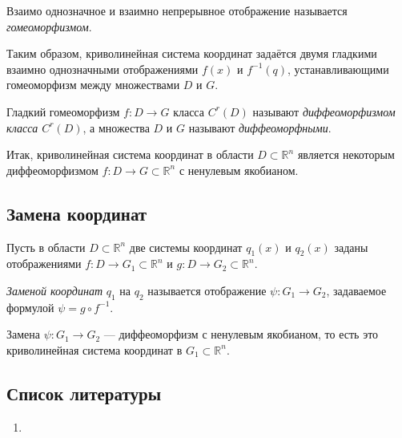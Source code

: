 \begin{definition}
  Взаимо однозначное и взаимно непрерывное отображение называется
  \textit{гомеоморфизмом}.
\end{definition}

Таким образом, криволинейная система координат задаётся двумя гладкими взаимно
однозначными отображениями $f(x)$ и $f^{-1}(q)$, устанавливающими гомеоморфизм
между множествами $D$ и $G$.

\begin{definition}
  Гладкий гомеоморфизм $f : D \to G$ класса $C^r(D)$ называют
  \textit{диффеоморфизмом класса $C^r(D)$}, а множества $D$ и $G$ называют
  \textit{диффеоморфными}.
\end{definition}

Итак, криволинейная система координат в области $D \subset \mathbb{R}^n$
является некоторым диффеоморфизмом $f : D \to G \subset \mathbb{R}^n$ с
ненулевым якобианом.

\subsection{Замена координат}

Пусть в области $D \subset \mathbb{R}^n$ две системы координат $q_1(x)$ и
$q_2(x)$ заданы отображениями $f : D \to G_1 \subset \mathbb{R}^n$ и
$g : D \to G_2 \subset \mathbb{R}^n$.

\begin{definition}
  \textit{Заменой координат} $q_1$ на $q_2$ называется отображение
  $\psi : G_1 \to G_2$, задаваемое формулой $\psi = g \circ f^{-1}$.
\end{definition}

\begin{remark}
  Замена $\psi : G_1 \to G_2$ --- диффеоморфизм с ненулевым якобианом, то есть
  это криволинейная система координат в $G_1 \subset \mathbb{R}^n$.
\end{remark}

\begin{figure}[H]
  \centering
  

  \caption{}
  \label{fig:coords_map}
\end{figure}

\subsection{Список литературы}
\begin{enumerate}
  \item \cite{lectures}
\end{enumerate}

